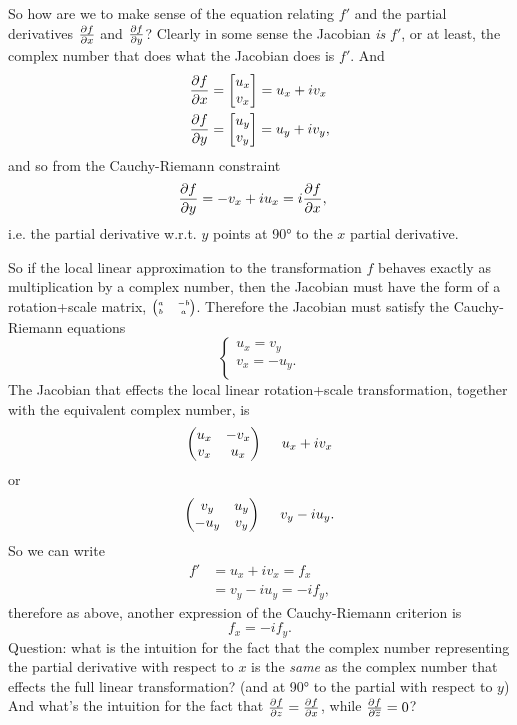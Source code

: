\documentclass[12pt]{article}
\renewcommand{\bar}{\overline}
\begin{document}
So how are we to make sense of the equation relating $f'$ and the partial
derivatives $\frac{\partial f}{\partial x}$ and $\frac{\partial f}{\partial y}$? Clearly in some sense the Jacobian \textit{is}
$f'$, or at least, the complex number that does what the Jacobian does is
$f'$. And
\begin{align*}
\frac{\partial f}{\partial x} &= \begin{bmatrix}u_x\\v_x\end{bmatrix} = u_x + iv_x \\
\frac{\partial f}{\partial y} &= \begin{bmatrix}u_y\\v_y\end{bmatrix} = u_y + iv_y,
\end{align*}
and so from the Cauchy-Riemann constraint
\begin{align*}
\frac{\partial f}{\partial y} &= -v_x + iu_x = i\frac{\partial f}{\partial x},
\end{align*}
i.e. the partial derivative w.r.t. $y$ points at 90° to the $x$ partial
derivative.



So if the local linear approximation to the transformation $f$ behaves exactly as
multiplication by a complex number, then the Jacobian must have the form of a
rotation+scale matrix, $\tiny{\begin{pmatrix}a & -b\\b & a\\ \end{pmatrix}}$. Therefore the Jacobian must satisfy the
Cauchy-Riemann equations
$$
\begin{cases}
u_x = v_y \\
v_x = -u_y. \\
\end{cases}
$$
The Jacobian that effects the local linear rotation+scale transformation, together with
the equivalent complex number, is
$$
\begin{pmatrix}u_x & -v_x\\v_x & u_x\\ \end{pmatrix} ~~~~ u_x + iv_x
$$
or
$$
\begin{pmatrix}v_y & u_y\\-u_y & v_y\\ \end{pmatrix} ~~~~ v_y - iu_y.
$$
So we can write
\begin{align*}
f'
&= u_x + iv_x = f_x \\
&= v_y - iu_y = -if_y,
\end{align*}
therefore as above, another expression of the Cauchy-Riemann criterion is
$$
f_x = -if_y.
$$
Question: what is the intuition for the fact that the complex number
representing the partial derivative with respect to $x$ is the \textit{same} as
the complex number that effects the full linear transformation? (and at 90° to
the partial with respect to $y$) And what's the intuition for the fact that
$\frac{\partial f}{\partial z} = \frac{\partial f}{\partial x}$, while $\dfdzbar = 0$?
\end{document}
